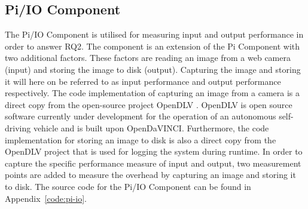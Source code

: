


\subsection{Pi/IO Component}
\label{section:exp-units-piio}
The Pi/IO Component is utilised for measuring input and output performance in order to answer RQ2. The component is an extension of the Pi Component with two additional factors. These factors are reading an image from a web camera (input) and storing the image to disk (output). Capturing the image and storing it will here on be referred to as input performance  and output performance respectively. The code implementation of capturing an image from a camera is a direct copy from the open-source project OpenDLV \cite{opendlv}. OpenDLV is open source software currently under development for the operation of an autonomous self-driving vehicle and is built upon OpenDaVINCI. Furthermore, the code implementation for storing an image to disk is also a direct copy from the OpenDLV project that is used for logging the system during runtime. In order to capture the specific performance measure of input and output, two measurement points are added to measure the overhead by capturing an image and storing it to disk. The source code for the Pi/IO Component can be found in Appendix~\ref{code:pi-io}.


